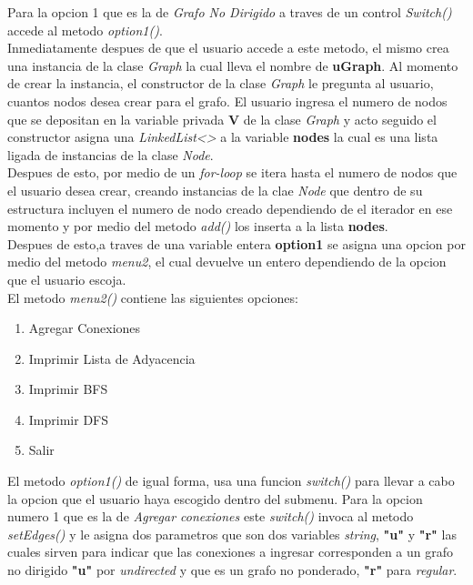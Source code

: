 \documentclass{article}
\begin{document}
				Para la opcion 1 que es la de \textit{Grafo No Dirigido} a traves de un control \textit{Switch()} accede al metodo \emph{option1()}.\\
				
				Inmediatamente despues de que el usuario accede a este metodo, el mismo crea una instancia de la clase \emph{Graph} la cual lleva el nombre de \textbf{uGraph}. Al momento de crear la instancia, el constructor de la clase \emph{Graph} le pregunta al usuario, cuantos nodos desea crear para el grafo. El usuario ingresa el numero de nodos que se depositan en la variable privada \textbf{V} de la clase \emph{Graph} y acto seguido el constructor asigna una \textit{LinkedList<>} a la variable \textbf{nodes} la cual es una lista ligada de instancias de la clase \emph{Node}.\\
				
				Despues de esto, por medio de un \textit{for-loop} se itera hasta el numero de nodos que el usuario desea crear, creando instancias de la clae \emph{Node} que dentro de su estructura incluyen el numero de nodo creado dependiendo de el iterador en ese momento y por medio del metodo \emph{add()} los inserta a la lista \textbf{nodes}.\\   
				
				Despues de esto,a traves de una variable entera \textbf{option1} se asigna una opcion por medio del metodo \emph{menu2}, el cual devuelve un entero dependiendo de la opcion que el usuario escoja.\\
				
				El metodo \emph{menu2()} contiene las siguientes opciones:
				
				\begin{enumerate}
					\item Agregar Conexiones
					\item Imprimir Lista de Adyacencia
					\item Imprimir BFS
					\item Imprimir DFS
					\item Salir
				\end{enumerate}
			
				El metodo \emph{option1()} de igual forma, usa una funcion \textit{switch()} para llevar a cabo la opcion que el usuario haya escogido dentro del submenu. Para la opcion numero 1 que es la de \textit{Agregar conexiones} este \textit{switch()} invoca al metodo \emph{setEdges()} y le asigna dos parametros que son dos variables \textit{string}, \textbf{"u"} y \textbf{"r"} las cuales sirven para indicar que las conexiones a ingresar corresponden a un grafo no dirigido \textbf{"u"} por \textit{undirected} y que es un grafo no ponderado, \textbf{"r"} para \textit{regular}.\\
				
\end{document}
